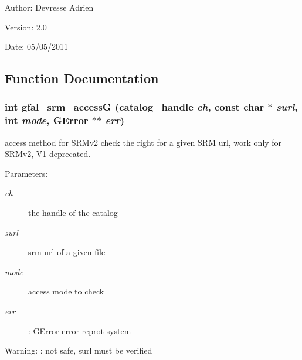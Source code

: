 \begin{Desc}
\item[Author:]Devresse Adrien \end{Desc}
\begin{Desc}
\item[Version:]2.0 \end{Desc}
\begin{Desc}
\item[Date:]05/05/2011 \end{Desc}


\subsection{Function Documentation}
\subsubsection{\setlength{\rightskip}{0pt plus 5cm}int gfal\_\-srm\_\-access\-G (catalog\_\-handle {\em ch}, const char $\ast$ {\em surl}, int {\em mode}, GError $\ast$$\ast$ {\em err})}\label{gfal__common__srm__access_8c_c97d6cdbdc19261f398fece514431491}


access method for SRMv2 check the right for a given SRM url, work only for SRMv2, V1 deprecated. 

\begin{Desc}
\item[Parameters:]
\begin{description}
\item[{\em ch}]the handle of the catalog \item[{\em surl}]srm url of a given file \item[{\em mode}]access mode to check \item[{\em err}]: GError error reprot system \end{description}
\end{Desc}
\begin{Desc}
\item[Warning:]: not safe, surl must be verified \end{Desc}

